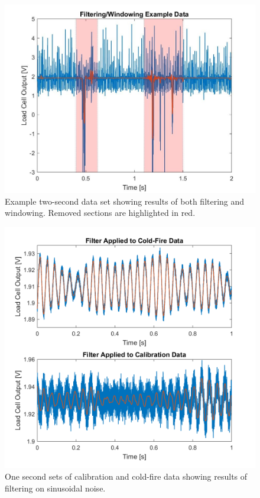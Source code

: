 \documentclass[journal]{IEEEtran}
\begin{document}
\begin{figure}
  \includegraphics[width=\linewidth]{figs/raw-data.jpg}
  \caption{Example two-second data set showing results of both filtering and windowing. Removed sections are highlighted in red.}
\label{fig:raw-data}
\end{figure}

\begin{figure}
  \includegraphics[width=\linewidth]{figs/other-raw-data.png}
  \caption{One second sets of calibration and cold-fire data showing results of filtering on sinusoidal noise.}
\label{fig:other-raw-data}
\end{figure}
\end{document}
